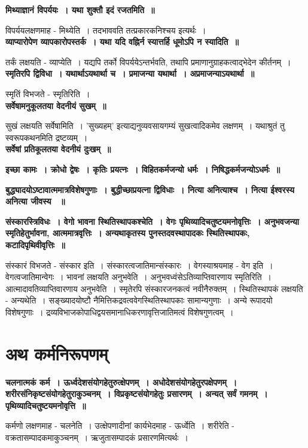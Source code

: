 {\bfseries मिथ्याज्ञानं विपर्ययः~। यथा शुक्तौ इदं रजतमिति~॥}\par
	विपर्ययलक्षणमाह - मिथ्येति~। तदभाववति तत्प्रकारकनिश्चय इत्यर्थः~।\\[10pt]
{\bfseries व्याप्यारोपेण व्यापकारोपस्तर्क~। यथा यदि वह्निर्न स्यात्तर्हि धूमोऽपि न स्यादिति~॥}\par
	तर्कं लक्षयति - व्याप्येति~। यद्यपि तर्को विपर्ययेऽन्तर्भवति, तथापि प्रमाणानुग्राहकत्वाद्भेदेन कीर्तनम्~।\\[10pt]
{\bfseries स्मृतिरपि द्विविधा~। यथार्थाऽयथार्था च~। प्रमाजन्या यथार्था~। अप्रमाजन्याऽयथार्था~॥}\par
	स्मृतिं विभजते - स्मृतिरिति~।\\[10pt]
{\bfseries सर्वेषामनुकूलतया वेदनीयं सुखम्~॥}\par
	सुखं लक्षयति सर्वेषामिति~। ’सुख्यहम्’ इत्याद्यनुव्यवसायगम्यं सुखत्वादिकमेव लक्षणम्~। यथाश्रुतं तु स्वरूपकथनमिति द्रष्टव्यम्~।\\[10pt]
{\bfseries सर्वेषां प्रतिकूलतया वेदनीयं दुःखम्~॥}\par
{\bfseries इच्छा कामः~। क्रोधो द्वेषः~। कृतिः प्रयत्नः~। विहितकर्मजन्यो धर्मः~। निषिद्धकर्मजन्योऽधर्मः~॥}\par
{\bfseries बुद्ध्यादयोऽष्टावात्ममात्रविशेषगुणाः~। बुद्धीच्छाप्रयत्ना द्विविधाः~। नित्या अनित्याश्च~। नित्या ईश्वरस्य अनित्या जीवस्य ~॥}\par
{\bfseries संस्कारस्त्रिविधः~। वेगो भावना स्थितिस्थापकश्चेति~। वेगः पृथिव्यादिचतुष्टयमनोवृत्तिः~। अनुभवजन्या स्मृतिहेतुर्भावना, आत्ममात्रवृत्तिः~। अन्यथाकृतस्य पुनस्तदवस्थापादकः स्थितिस्थापकः, कटादिपृथिवीवृत्तिः~॥}\par
	संस्कारं विभजते - संस्कार इति~। संस्कारत्वजातिमान्संस्कारः~। वेगस्याश्रयमाह - वेग इति~। वेगत्वजातिमान्वेगः~। भावनां लक्षयति अनुभवेति~। अनुभवध्वंसेऽतिव्याप्तिवारणाय स्मृतिरिति~। आत्मादावतिव्याप्तिवारणाय अनुभवेति~। स्मृतेरपि संस्कारजनकत्वं नवीनैरुक्तम्~। स्थितिस्थापकं लक्षयति - अन्यथेति~। सङ्ख्यादयोष्टौ नैमित्तिकद्रवत्ववेगस्थितिस्थापकाः सामान्यगुणाः~। अन्ये रूपादयो विशेषगुणाः~। द्रव्यविभाजकोपाधिद्वयसमानाधिकरणावृत्तिजातिमत्वं विशेषगुणत्वम्~।\\
\section*{अथ कर्मनिरूपणम्}
{\bfseries चलनात्मकं कर्म~। ऊर्ध्वदेशसंयोगहेतुरुत्क्षेपणम्~। अधोदेशसंयोगहेतुरपक्षेपणम्~। शरीरसंनिकृष्टसंयोगहेतुराकुञ्चनम्~। विप्रकृष्टसंयोगहेतुः प्रसारणम्~। अन्यत् सर्वं गमनम्~। पृथिव्यादिचतुष्टयमनोवृत्ति~॥}\par
	कर्मणो लक्षणमाह - चलनेति~। उत्क्षेपणादीनां कार्यभेदमाह - ऊर्ध्वेति~। शरीरेति - वक्रतासम्पादकमाकुञ्चनम्~। ऋजुतासम्पादकं प्रसारणमित्यर्थः~।\\
